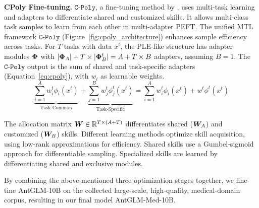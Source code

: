 \documentclass{article} %
\begin{document}
\textbf{CPoly Fine-tuning.} $\texttt{C-Poly}$, a fine-tuning method by \cite{iclr2023customizable}, uses multi-task learning and adapters to differentiate shared and customized skills. It allows multi-class task samples to learn from each other in multi-adapter PEFT. The unified MTL framework $\texttt{C-Poly}$ (Figure~\ref{fig:cpoly_architecture}) enhances sample efficiency across tasks. For $T$ tasks with data $x^t$, the PLE-like structure has adapter modules ${\bm{\Phi}}$ with $|{\bm{\Phi}}_A| + T \times |{\bm{\Phi}}_B^t| = A + T \times B$ adapters, assuming $B=1$. The $\texttt{C-Poly}$ output is the sum of shared and task-specific adapters (Equation~\ref{eq:cpoly}), with $w_i$ as learnable weights.
\begin{equation}
\label{eq:cpoly}
        \underbrace{\sum_{i=1}^{A}{w^{t}_{i}\phi_{i}(x^t)}}_{\text{Task-Common}} + \underbrace{\sum_{j=1}^{B}w^{t}_{j}\phi^{t}_{j}(x^t)}_{\text{Task-Specific}}
        = \sum_{i=1}^{A}{w^{t}_{i}\phi_{i}(x^t)} + 
        w^{t}\phi^{t}(x^t)
\end{equation}

The allocation matrix ${\bm{W}} \in \mathbb{R}^{T \times (A + T)}$ differentiates shared (${\bm{W}}_A$) and customized (${\bm{W}}_B$) skills. Different learning methods optimize skill acquisition, using low-rank approximations for efficiency. Shared skills use a Gumbel-sigmoid approach for differentiable sampling. Specialized skills are learned by differentiating shared and exclusive modules.

By combining the above-mentioned three optimization stages together, we fine-tine AntGLM-10B on the collected large-scale, high-quality, medical-domain corpus, resulting in our final model AntGLM-Med-10B.

\end{document}
